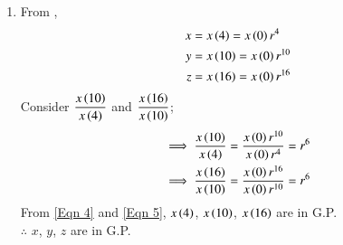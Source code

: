 \documentclass[journal,12pt,twocolumn]{IEEEtran}
\theoremstyle{remark}
\begin{document}
\begin{enumerate}
\item From ,
\begin{align}
    x&= x\left(4\right) =x\left(0\right)r^4 \\
 y&=x\left(10\right)=x\left(0\right)r^{10} \\
 z&=x\left(16\right)=x\left(0\right)r^{16}
\end{align}
Consider $\dfrac{x\left(10\right)}{x\left(4\right)}$ and $\dfrac{x\left(16\right)}{x\left(10\right)}$;
\begin{align}
 \implies\dfrac{x\left(10\right)}{x\left(4\right)} &= \dfrac{x\left(0\right)r^{10}}{x\left(0\right)r^4} = r^6 \label{Eqn 4}\\ 
 \implies\dfrac{x\left(16\right)}{x\left(10\right)} &= \dfrac{x\left(0\right)r^{16}}{x\left(0\right)r^{10}} = r^6\label{Eqn 5}
\end{align}
From \eqref{Eqn 4} and \eqref{Eqn 5}, $x\left(4\right)$, $x\left(10\right)$, $x\left(16\right)$ are in G.P.\\
$\therefore$  $x$, $y$, $z$ are in G.P.\\


\end{enumerate}
\end{document}
